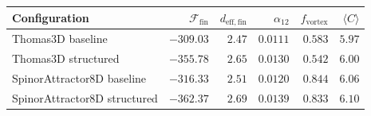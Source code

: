 \begin{tabular}{lrrrrr}
\toprule
Configuration & $\mathcal{F}_{\mathrm{fin}}$ & $d_{\mathrm{eff,fin}}$ & $\alpha_{12}$ & $f_{\mathrm{vortex}}$ & $\langle C \rangle$ \\
\midrule
Thomas3D baseline       & $-309.03$ & $2.47$ & $0.0111$ & $0.583$ & $5.97$ \\
Thomas3D structured     & $-355.78$ & $2.65$ & $0.0130$ & $0.542$ & $6.00$ \\
SpinorAttractor8D baseline  & $-316.33$ & $2.51$ & $0.0120$ & $0.844$ & $6.06$ \\
SpinorAttractor8D structured & $-362.37$ & $2.69$ & $0.0139$ & $\mathbf{0.833}$ & $6.10$ \\
\bottomrule
\end{tabular}
